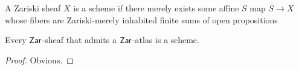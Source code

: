 \begin{definition}
	A Zariski sheaf $X$ is a scheme if there merely exists some affine $S$  map $S \to X$ whose fibers are Zariski-merely inhabited finite sums of open propositions 
\end{definition}
\begin{lemma}{\label{lemma:IsScheme}}
	Every $\mathsf{Zar}$-sheaf that admits a $\mathsf{Zar}$-atlas is a scheme. 
\end{lemma}
\begin{proof}
	Obvious.
\end{proof}
